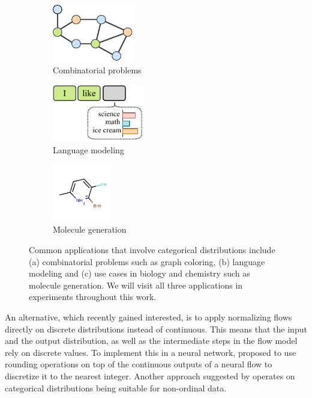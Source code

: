 \begin{figure}[b!]
    \centering
    \begin{subfigure}{.3\textwidth}
        \centering
        \includegraphics[height=2.5cm]{figures/intro_figures/graph_coloring.pdf}
        \caption{Combinatorial problems}
        \label{fig:introduction_applications_combinatorial_problems}
    \end{subfigure}
    \hfill
    \begin{subfigure}{.3\textwidth}
        \centering
        \vfill
        \includegraphics[height=2.5cm]{figures/intro_figures/language_modeling.pdf}
        \caption{Language modeling}
        \label{fig:introduction_applications_language_modeling}
    \end{subfigure}
    \hfill
    \begin{subfigure}{.3\textwidth}
        \centering
        \includegraphics[height=2.5cm]{figures/intro_figures/zinc250k_tiny_981.pdf} %
        \caption{Molecule generation}
        \label{fig:introduction_applications_molecule_generation}
    \end{subfigure}
    \caption[Common applications and areas involving categorical distributions]{
    Common applications that involve categorical distributions include (a) combinatorial problems such as graph coloring, (b) language modeling and (c) use cases in biology and chemistry such as molecule generation. We will visit all three applications in experiments throughout this work.}
    \label{fig:introduction_categorical_applications}
\end{figure}

An alternative, which recently gained interested, is to apply normalizing flows directly on discrete distributions instead of continuous. 
This means that the input and the output distribution, as well as the intermediate steps in the flow model rely on discrete values. 
To implement this in a neural network, \citet{IntegerNF} proposed to use rounding operations on top of the continuous outputs of a neural flow to discretize it to the nearest integer. 
Another approach suggested by \citet{TranDiscreteFlows} operates on categorical distributions being suitable for non-ordinal data. 

